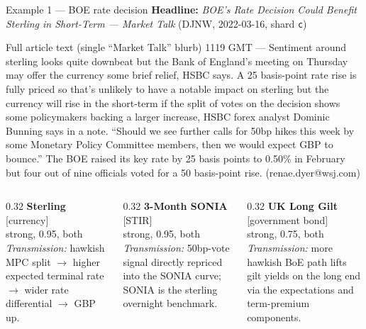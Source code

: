 \documentclass[10pt,aspectratio=169]{beamer}
\begin{document}
\begin{frame}[fragile]{Example 1 --- BOE rate decision}
  \scriptsize
  \textbf{Headline:} \emph{BOE's Rate Decision Could Benefit Sterling in Short-Term --- Market Talk} \hfill \scriptsize(DJNW, 2022-03-16, shard \texttt{c})

  \vspace{0.4em}
  \begin{block}{Full article text (single ``Market Talk'' blurb)}
    \scriptsize
    1119 GMT --- Sentiment around sterling looks quite downbeat but the Bank of England's meeting
    on Thursday may offer the currency some brief relief, HSBC says. A 25 basis-point rate rise
    is fully priced so that's unlikely to have a notable impact on sterling but the currency will
    rise in the short-term if the split of votes on the decision shows some policymakers backing
    a larger increase, HSBC forex analyst Dominic Bunning says in a note. ``Should we see further
    calls for 50bp hikes this week by some Monetary Policy Committee members, then we would
    expect GBP to bounce.'' The BOE raised its key rate by 25 basis points to 0.50\% in February
    but four out of nine officials voted for a 50 basis-point rise. (renae.dyer@wsj.com)
  \end{block}

  \vspace{0.3em}
  \begin{columns}[T,onlytextwidth]
    \begin{column}{0.32\textwidth}
      \textbf{\textcolor{triggerblue}{Sterling}} \\[0.1em]
      [currency]\\
      strong, 0.95, both\\[0.2em]
      \emph{Transmission:} hawkish MPC split $\rightarrow$ higher expected
      terminal rate $\rightarrow$ wider rate differential $\rightarrow$ GBP up.
    \end{column}
    \begin{column}{0.32\textwidth}
      \textbf{\textcolor{triggerblue}{3-Month SONIA}} \\[0.1em]
      [STIR]\\
      strong, 0.95, both\\[0.2em]
      \emph{Transmission:} 50bp-vote signal directly repriced into the SONIA
      curve; SONIA is the sterling overnight benchmark.
    \end{column}
    \begin{column}{0.32\textwidth}
      \textbf{\textcolor{triggerblue}{UK Long Gilt}} \\[0.1em]
      [government bond]\\
      strong, 0.75, both\\[0.2em]
      \emph{Transmission:} more hawkish BoE path lifts gilt yields on the
      long end via the expectations and term-premium components.
    \end{column}
  \end{columns}


\end{frame}
\end{document}
